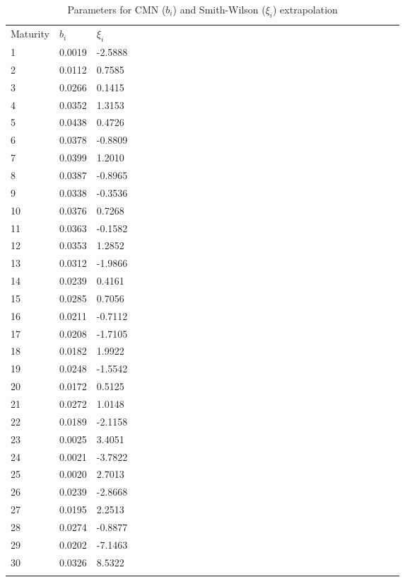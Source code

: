 \begin{table}
\begin{center}
\caption{Parameters for CMN ($b_i$) and Smith-Wilson ($\xi_i$) extrapolation}
\label{tab:ametrano2013tables1}       %
\begin{tabular}{llllllllllllllllllllllllllllll}
\hline\noalign{\smallskip}
Maturity & $b_i$ & $\xi_i$  \\
\noalign{\smallskip}\hline\noalign{\smallskip}
  1 & 0.0019  & -2.5888\\
  2 & 0.0112  & 0.7585\\
  3 & 0.0266  & 0.1415\\
  4 & 0.0352  & 1.3153\\
  5 & 0.0438  & 0.4726\\
  6 & 0.0378  & -0.8809\\
  7 & 0.0399  & 1.2010\\
  8 & 0.0387  & -0.8965\\
  9 & 0.0338  & -0.3536\\
  10 & 0.0376 & 0.7268\\
  11 & 0.0363 & -0.1582\\
  12 & 0.0353 & 1.2852\\
  13 & 0.0312 & -1.9866\\
  14 & 0.0239 & 0.4161\\
  15 & 0.0285 & 0.7056\\
  16 & 0.0211 & -0.7112\\
  17 & 0.0208 & -1.7105\\
  18 & 0.0182 & 1.9922\\
  19 & 0.0248 & -1.5542\\
  20 & 0.0172 & 0.5125\\
  21 & 0.0272 & 1.0148\\
  22 & 0.0189 & -2.1158\\
  23 & 0.0025 & 3.4051\\
  24 & 0.0021 & -3.7822\\
  25 & 0.0020 & 2.7013\\
  26 & 0.0239 & -2.8668\\
  27 & 0.0195 & 2.2513\\
  28 & 0.0274 & -0.8877\\
  29 & 0.0202 & -7.1463\\
  30 & 0.0326 & 8.5322\\
\noalign{\smallskip}\hline
\end{tabular}
\end{center}
\end{table}

